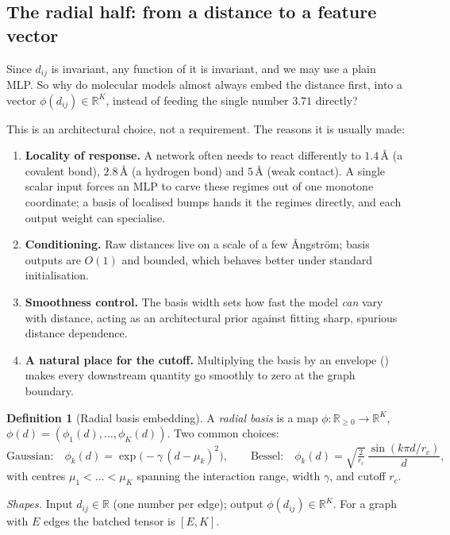 \documentclass[11pt,a4paper]{report}
\theoremstyle{definition}
\newtheorem{definition}[definition]{Definition}
\theoremstyle{remark}
\newcommand{\RR}{\mathbb R}
\begin{document}
\subsection{The radial half: from a distance to a feature vector}
\label{sec:radial-features}

Since $d_{ij}$ is invariant, any function of it is invariant, and we may use
a plain MLP. So why do molecular models almost always embed the distance
first, into a vector $\phi(d_{ij})\in\RR^K$, instead of feeding the single
number $3.71$ directly?

This is an architectural choice, not a requirement. The reasons it is usually
made:

\begin{enumerate}
\item \textbf{Locality of response.} A network often needs to react
differently to $1.4$\,\r A (a covalent bond), $2.8$\,\r A (a hydrogen bond)
and $5$\,\r A (weak contact). A single scalar input forces an MLP to carve
these regimes out of one monotone coordinate; a basis of localised bumps
hands it the regimes directly, and each output weight can specialise.
\item \textbf{Conditioning.} Raw distances live on a scale of a few
\r Angstr\"om; basis outputs are $O(1)$ and bounded, which behaves better
under standard initialisation.
\item \textbf{Smoothness control.} The basis width sets how fast the model
\emph{can} vary with distance, acting as an architectural prior against
fitting sharp, spurious distance dependence.
\item \textbf{A natural place for the cutoff.} Multiplying the basis by an
envelope () makes every downstream quantity go smoothly to
zero at the graph boundary.
\end{enumerate}

\begin{definition}[Radial basis embedding]
\label{def:rbf}
A \emph{radial basis} is a map $\phi:\RR_{\ge0}\to\RR^K$,
$\phi(d)=(\phi_1(d),\dots,\phi_K(d))$. Two common choices:
\[
\text{Gaussian:}\quad \phi_k(d)=\exp\bigl(-\gamma\,(d-\mu_k)^2\bigr),
\qquad
\text{Bessel:}\quad \phi_k(d)=\sqrt{\tfrac{2}{r_c}}\,\frac{\sin(k\pi d/r_c)}{d},
\]
with centres $\mu_1<\dots<\mu_K$ spanning the interaction range, width
$\gamma$, and cutoff $r_c$.
\end{definition}

\emph{Shapes.} Input $d_{ij}\in\RR$ (one number per edge); output
$\phi(d_{ij})\in\RR^K$. For a graph with $E$ edges the batched tensor is
$[E,K]$.
\end{document}
